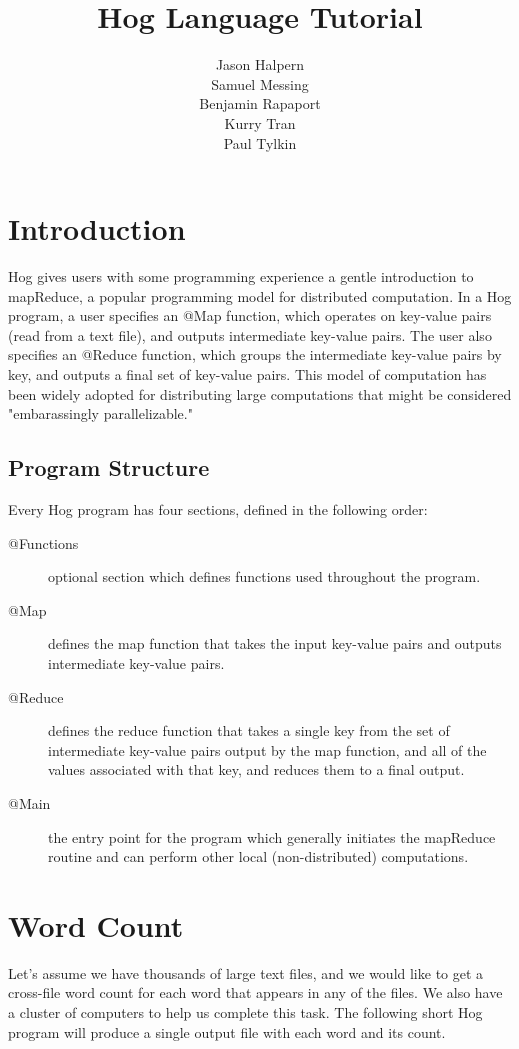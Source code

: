 \documentclass{article}
\title{\huge \textbf{Hog Language Tutorial}}
\author{Jason Halpern\\ Samuel Messing\\ 
        Benjamin Rapaport \\  Kurry Tran \\ Paul Tylkin}
\begin{document}
\maketitle
\newpage

\section*{Introduction}
\label{sec:introduction}

Hog gives users with some programming experience a gentle introduction to mapReduce, a popular programming model for distributed computation. In a Hog program, a user specifies an @Map function, which operates on key-value pairs (read from a text file), and outputs intermediate key-value pairs. The user also specifies an @Reduce function, which groups the intermediate key-value pairs by key, and outputs a final set of key-value pairs. This model of computation has been widely adopted for distributing large computations that might be considered "embarassingly parallelizable."

\subsection*{Program Structure} %
\label{sub:program_structure}
Every Hog program has four sections, defined in the following order:
\begin{description}
\item[@Functions] optional section which defines functions used throughout the program.
\item[@Map] defines the map function that takes the input key-value pairs and outputs intermediate key-value pairs.
\item[@Reduce] defines the reduce function that takes a single key from the set of intermediate key-value pairs output by the map function, and all of the values associated with that key, and reduces them to a final output.
\item [@Main] the entry point for the program which generally initiates the mapReduce routine and can perform other local (non-distributed) computations.
\end{description}

\section*{Word Count}
\label{word_count}
Let's assume we have thousands of large text files, and we would like to get a cross-file word count for each word that appears in any of the files. We also have a cluster of computers to help us complete this task. The following short Hog program will produce a single output file with each word and its count.
\end{document}
